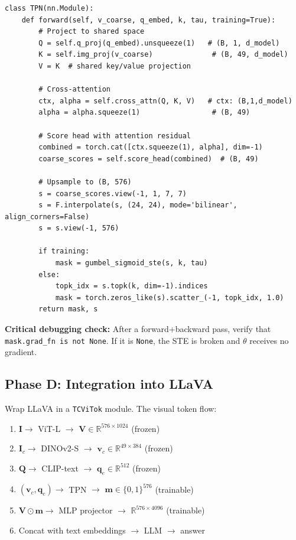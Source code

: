 \documentclass[12pt,a4paper]{article}
\newcommand{\R}{\mathbb{R}}
\newcommand{\vv}{\mathbf{v}}     %
\newcommand{\vq}{\mathbf{q}}     %
\newcommand{\vm}{\mathbf{m}}     %
\newcommand{\mI}{\mathbf{I}}     %
\newcommand{\mQ}{\mathbf{Q}}     %
\newcommand{\mV}{\mathbf{V}}     %
\begin{document}
\begin{lstlisting}[caption={Core TPN forward pass.}]
class TPN(nn.Module):
    def forward(self, v_coarse, q_embed, k, tau, training=True):
        # Project to shared space
        Q = self.q_proj(q_embed).unsqueeze(1)   # (B, 1, d_model)
        K = self.img_proj(v_coarse)              # (B, 49, d_model)
        V = K  # shared key/value projection

        # Cross-attention
        ctx, alpha = self.cross_attn(Q, K, V)   # ctx: (B,1,d_model)
        alpha = alpha.squeeze(1)                 # (B, 49)

        # Score head with attention residual
        combined = torch.cat([ctx.squeeze(1), alpha], dim=-1)
        coarse_scores = self.score_head(combined)  # (B, 49)

        # Upsample to (B, 576)
        s = coarse_scores.view(-1, 1, 7, 7)
        s = F.interpolate(s, (24, 24), mode='bilinear', align_corners=False)
        s = s.view(-1, 576)

        if training:
            mask = gumbel_sigmoid_ste(s, k, tau)
        else:
            topk_idx = s.topk(k, dim=-1).indices
            mask = torch.zeros_like(s).scatter_(-1, topk_idx, 1.0)
        return mask, s
\end{lstlisting}

\textbf{Critical debugging check:} After a forward+backward pass, verify that
\texttt{mask.grad\_fn is not None}. If it is \texttt{None}, the STE is broken
and $\theta$ receives no gradient.

\subsection{Phase D: Integration into LLaVA}

Wrap LLaVA in a \texttt{TCViTok} module. The visual token flow:
\begin{enumerate}[leftmargin=2em]
  \item $\mI \to$ ViT-L $\to$ $\mV \in \R^{576 \times 1024}$ (frozen)
  \item $\mI_c \to$ DINOv2-S $\to$ $\vv_c \in \R^{49 \times 384}$ (frozen)
  \item $\mQ \to$ CLIP-text $\to$ $\vq_e \in \R^{512}$ (frozen)
  \item $(\vv_c, \vq_e) \to$ TPN $\to$ $\vm \in \{0,1\}^{576}$ (trainable)
  \item $\mV \odot \vm \to$ MLP projector $\to$ $\R^{576 \times 4096}$ (trainable)
  \item Concat with text embeddings $\to$ LLM $\to$ answer
\end{enumerate}
\end{document}
